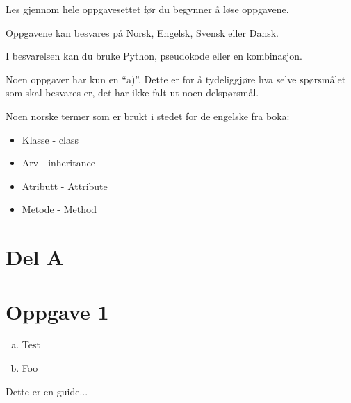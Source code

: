 Les gjennom hele oppgavesettet før du begynner å løse oppgavene. 

Oppgavene kan besvares på Norsk, Engelsk, Svensk eller Dansk. 

I besvarelsen kan du bruke Python, pseudokode eller en kombinasjon.

Noen oppgaver har kun en ``a)''. Dette er for å tydeliggjøre hva selve
spørsmålet som skal besvares er, det har ikke falt ut noen delspørsmål.

Noen norske termer som er brukt i stedet for de engelske fra boka: 
\begin{itemize}
\item Klasse - class
\item Arv - inheritance
\item Atributt - Attribute
\item Metode - Method
\end{itemize}

\section*{Del A}

\section*{Oppgave 1}

\begin{enumerate}[a)]
\item Test
\item Foo
\end{enumerate}

\begin{eguide}
Dette er en guide... 
\end{eguide}


